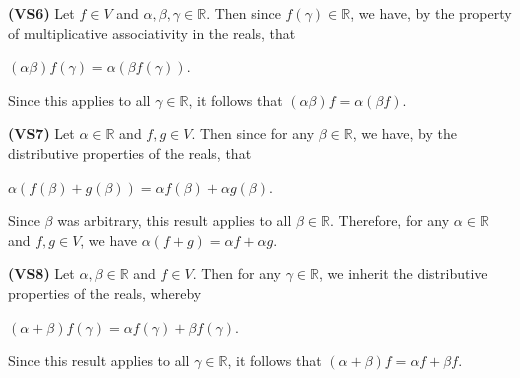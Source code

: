 \documentclass[12pt, a4paper]{article}
\begin{document}
\begin{enumerate}
    \vspace{4mm}
    
    \textbf{(VS6) }Let $f\in V$ and $\alpha,\beta,\gamma\in\mathbb{R}$. Then since $f(\gamma)\in\mathbb{R}$, we have, by the property of multiplicative associativity in the reals, that\par
    
    \vspace{2mm}
    
    \centerline{$(\alpha\beta)f(\gamma)=\alpha(\beta f(\gamma))$.}
    
    \vspace{2mm}
    
    Since this applies to all $\gamma\in\mathbb{R}$, it follows that $(\alpha\beta)f=\alpha(\beta f)$.
    
    \vspace{4mm}
    
    \textbf{(VS7) }Let $\alpha\in\mathbb{R}$ and $f,g\in V$. Then since for any $\beta\in\mathbb{R}$, we have, by the distributive properties of the reals, that\par
    
    \vspace{2mm}
    
    \centerline{$\alpha(f(\beta)+g(\beta))=\alpha f(\beta)+\alpha g(\beta)$.}
    
    \vspace{2mm}
    
    Since $\beta$ was arbitrary, this result applies to all $\beta\in\mathbb{R}$. Therefore, for any $\alpha\in\mathbb{R}$ and $f,g\in V$, we have $\alpha(f+g)=\alpha f+\alpha g$.
    
    \vspace{4mm}
    
    \textbf{(VS8) }Let $\alpha,\beta\in\mathbb{R}$ and $f\in V$. Then for any $\gamma\in\mathbb{R}$, we inherit the distributive properties of the reals, whereby\par
    
    \vspace{2mm}
    
    \centerline{$(\alpha+\beta)f(\gamma)=\alpha f(\gamma)+\beta f(\gamma)$.}
    
    \vspace{2mm}
    
    Since this result applies to all $\gamma\in\mathbb{R}$, it follows that $(\alpha+\beta)f=\alpha f+\beta f$.
    
    \vspace{2mm}
    

\end{enumerate}
\end{document}
